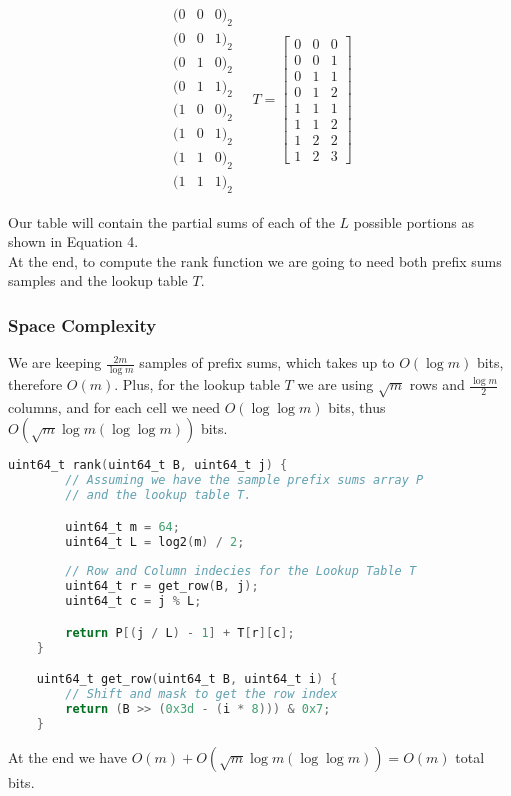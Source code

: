 \documentclass{article}
\begin{document}
\begin{align}
     \begin{matrix}
         (0 & 0 & 0)_2 \\
         (0 & 0 & 1)_2 \\
         (0 & 1 & 0)_2 \\
         (0 & 1 & 1)_2 \\
         (1 & 0 & 0)_2 \\
         (1 & 0 & 1)_2 \\
         (1 & 1 & 0)_2 \\
         (1 & 1 & 1)_2
     \end{matrix} \quad
     T = 
     \begin{bmatrix}
        0 & 0 & 0 \\
        0 & 0 & 1 \\
        0 & 1 & 1 \\
        0 & 1 & 2 \\
        1 & 1 & 1 \\
        1 & 1 & 2 \\
        1 & 2 & 2 \\
        1 & 2 & 3
    \end{bmatrix} 
\end{align}

\noindent Our table will contain the partial sums of each of the $L$ possible portions as 
shown in Equation 4.\\

\noindent At the end, to compute the rank function we are going to need
both prefix sums samples and the lookup table $T$.

\subsubsection{Space Complexity}

We are keeping $\frac{2m}{\log m}$ samples of prefix sums, which takes up to $O(\log m)$ bits,
therefore $O(m)$.
Plus, for the lookup table $T$ we are using $\sqrt m$ rows and $\frac{\log m}{2}$ columns, and for each cell we
need $O(\log \log m)$ bits, thus $O(\sqrt{m}\log m (\log \log m))$ bits.

\begin{lstlisting}[language=C,caption=`Rank function implemented using a bit array of 64 elements.']
    uint64_t rank(uint64_t B, uint64_t j) {
        // Assuming we have the sample prefix sums array P
        // and the lookup table T.

        uint64_t m = 64; 
        uint64_t L = log2(m) / 2;
        
        // Row and Column indecies for the Lookup Table T
        uint64_t r = get_row(B, j);
        uint64_t c = j % L;

        return P[(j / L) - 1] + T[r][c];
    }

    uint64_t get_row(uint64_t B, uint64_t i) {
        // Shift and mask to get the row index
        return (B >> (0x3d - (i * 8))) & 0x7;
    }
\end{lstlisting}

\noindent At the end we have $O(m) + O(\sqrt{m}\log m (\log \log m)) = O(m)$ total bits.
\end{document}
